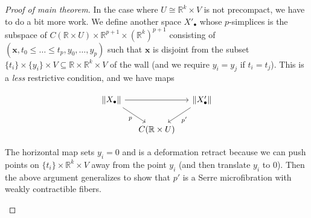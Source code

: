\documentclass{shortart}
\theoremstyle{definition}
\newcommand\R{\mathbb{R}}
\newcommand\dcirc[1]{\node [fill, circle, inner sep = 0, minimum size = 3] at #1 {};}
\begin{document}
\begin{proof}[Proof of main theorem]
  In the case where $U \cong \R^k \times V$ is not precompact, we have to do a bit more work. We define another space $X'_\bullet$ whose $p$-simplices is the subspace of $C(\R \times U) \times \R^{p + 1} \times (\R^k)^{p + 1}$ consisting of $(\mathbf{x}, t_0 \leq \ldots \leq t_p, y_0, \ldots, y_p)$ such that $\mathbf{x}$ is disjoint from the subset $\{t_i\} \times \{y_i\} \times V \subseteq \R \times \R^k \times V$ of the wall (and we require $y_i = y_j$ if $t_i = t_j$). This is a \emph{less} restrictive condition, and we have maps
  \begin{useimager}
    \[
      \begin{tikzcd}[column sep=small]
        \|X_\bullet\| \ar[rr] \ar[rd, "p"'] & & \|X_\bullet'\| \ar[ld, "p'"]\\
        & C(\R \times U)
      \end{tikzcd}
    \]
  \end{useimager}
  The horizontal map sets $y_i = 0$ and is a deformation retract because we can push points on $\{t_i\} \times \R^k \times V$ away from the point $y_i$ (and then translate $y_i$ to $0$). Then the above argument generalizes to show that $p'$ is a Serre microfibration with weakly contractible fibers.

  \begin{center}
  \end{center}\qedshift
\end{proof}
\end{document}
